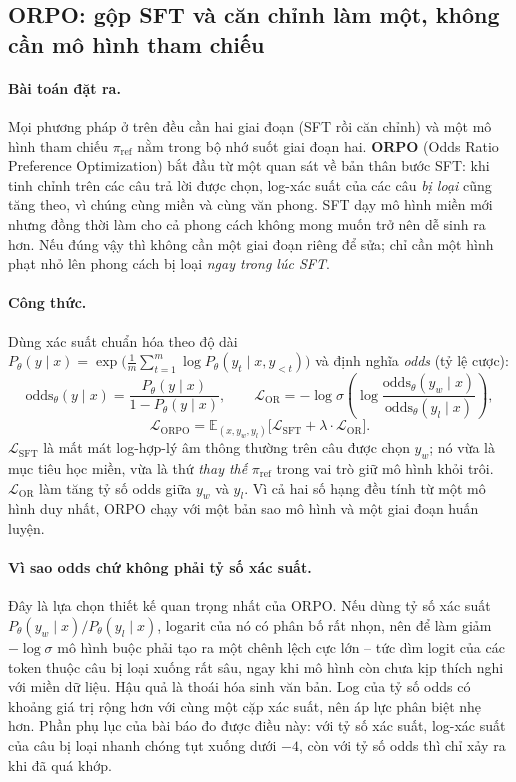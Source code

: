 \subsection{ORPO: gộp SFT và căn chỉnh làm một, không cần mô hình tham chiếu}
\label{ssec:orpo}

\paragraph{Bài toán đặt ra.} Mọi phương pháp ở trên đều cần hai giai đoạn (SFT rồi căn chỉnh) và một mô hình tham chiếu \( \pi_{\text{ref}} \) nằm trong bộ nhớ suốt giai đoạn hai. \textbf{ORPO} (Odds Ratio Preference Optimization) \cite{hong2024orpo} bắt đầu từ một quan sát về bản thân bước SFT: khi tinh chỉnh trên các câu trả lời được chọn, log-xác suất của các câu \emph{bị loại} cũng tăng theo, vì chúng cùng miền và cùng văn phong. SFT dạy mô hình miền mới nhưng đồng thời làm cho cả phong cách không mong muốn trở nên dễ sinh ra hơn. Nếu đúng vậy thì không cần một giai đoạn riêng để sửa; chỉ cần một hình phạt nhỏ lên phong cách bị loại \emph{ngay trong lúc SFT}.

\paragraph{Công thức.} Dùng xác suất chuẩn hóa theo độ dài \( P_\theta(y\mid x) = \exp\big(\frac{1}{m}\sum_{t=1}^{m}\log P_\theta(y_t\mid x, y_{<t})\big) \) và định nghĩa \emph{odds} (tỷ lệ cược):
\[
\text{odds}_\theta(y\mid x) = \frac{P_\theta(y\mid x)}{1 - P_\theta(y\mid x)}, \qquad
\mathcal{L}_{\text{OR}} = -\log\sigma\left(\log\frac{\text{odds}_\theta(y_w\mid x)}{\text{odds}_\theta(y_l\mid x)}\right),
\]
\[
\mathcal{L}_{\text{ORPO}} = \mathbb{E}_{(x, y_w, y_l)}\big[\mathcal{L}_{\text{SFT}} + \lambda\cdot\mathcal{L}_{\text{OR}}\big].
\]
\( \mathcal{L}_{\text{SFT}} \) là mất mát log-hợp-lý âm thông thường trên câu được chọn \( y_w \); nó vừa là mục tiêu học miền, vừa là thứ \emph{thay thế} \( \pi_{\text{ref}} \) trong vai trò giữ mô hình khỏi trôi. \( \mathcal{L}_{\text{OR}} \) làm tăng tỷ số odds giữa \( y_w \) và \( y_l \). Vì cả hai số hạng đều tính từ một mô hình duy nhất, ORPO chạy với một bản sao mô hình và một giai đoạn huấn luyện.

\paragraph{Vì sao odds chứ không phải tỷ số xác suất.} Đây là lựa chọn thiết kế quan trọng nhất của ORPO. Nếu dùng tỷ số xác suất \( P_\theta(y_w\mid x)/P_\theta(y_l\mid x) \), logarit của nó có phân bố rất nhọn, nên để làm giảm \( -\log\sigma \) mô hình buộc phải tạo ra một chênh lệch cực lớn -- tức dìm logit của các token thuộc câu bị loại xuống rất sâu, ngay khi mô hình còn chưa kịp thích nghi với miền dữ liệu. Hậu quả là thoái hóa sinh văn bản. Log của tỷ số odds có khoảng giá trị rộng hơn với cùng một cặp xác suất, nên áp lực phân biệt nhẹ hơn. Phần phụ lục của bài báo đo được điều này: với tỷ số xác suất, log-xác suất của câu bị loại nhanh chóng tụt xuống dưới \( -4 \), còn với tỷ số odds thì chỉ xảy ra khi đã quá khớp.

